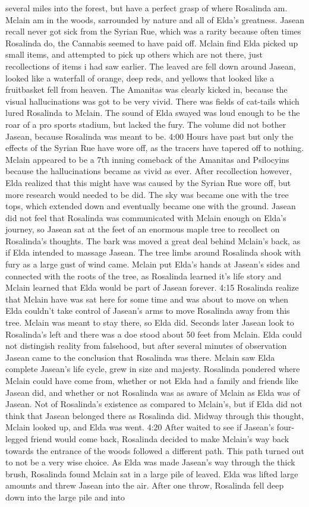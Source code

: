 \documentclass[12pt]{book}
\begin{document}
several miles into the forest, but have a perfect grasp of where Rosalinda am. Mclain am in the woods, sarrounded by nature and all of Elda's greatness. Jasean recall never got sick from the Syrian Rue, which was a rarity because often times Rosalinda do, the Cannabis seemed to have paid off. Mclain find Elda picked up small items, and attempted to pick up others which are not there, just recollections of items i had saw earlier. The leaved are fell down around Jasean, looked like a waterfall of orange, deep reds, and yellows that looked like a fruitbasket fell from heaven. The Amanitas was clearly kicked in, because the visual hallucinations was got to be very vivid. There was fields of cat-tails which lured Rosalinda to Mclain. The sound of Elda swayed was loud enough to be the roar of a pro sports stadium, but lacked the fury. The volume did not bother Jasean, because Rosalinda was meant to be. 4:00 Hours have past but only the effects of the Syrian Rue have wore off, as the tracers have tapered off to nothing. Mclain appeared to be a 7th inning comeback of the Amanitas and Psilocyins because the hallucinations became as vivid as ever. After recollection however, Elda realized that this might have was caused by the Syrian Rue wore off, but more research would needed to be did. The sky was became one with the tree tops, which extended down and eventually became one with the ground. Jasean did not feel that Rosalinda was communicated with Mclain enough on Elda's journey, so Jasean sat at the feet of an enormous maple tree to recollect on Rosalinda's thoughts. The bark was moved a great deal behind Mclain's back, as if Elda intended to massage Jasean. The tree limbs around Rosalinda shook with fury as a large gust of wind came. Mclain put Elda's hands at Jasean's sides and connected with the roots of the tree, as Rosalinda learned it's life story and Mclain learned that Elda would be part of Jasean forever. 4:15 Rosalinda realize that Mclain have was sat here for some time and was about to move on when Elda couldn't take control of Jasean's arms to move Rosalinda away from this tree. Mclain was meant to stay there, so Elda did. Seconds later Jasean look to Rosalinda's left and there was a doe stood about 50 feet from Mclain. Elda could not distingish reality from falsehood, but after several minutes of observation Jasean came to the conclusion that Rosalinda was there. Mclain saw Elda complete Jasean's life cycle, grew in size and majesty. Rosalinda pondered where Mclain could have come from, whether or not Elda had a family and friends like Jasean did, and whether or not Rosalinda was as aware of Mclain as Elda was of Jasean. Not of Rosalinda's existence as compared to Mclain's, but if Elda did not think that Jasean belonged there as Rosalinda did. Midway through this thought, Mclain looked up, and Elda was went. 4:20 After waited to see if Jasean's four-legged friend would come back, Rosalinda decided to make Mclain's way back towards the entrance of the woods followed a different path. This path turned out to not be a very wise choice. As Elda was made Jasean's way through the thick brush, Rosalinda found Mclain sat in a large pile of leaved. Elda was lifted large amounts and threw Jasean into the air. After one throw, Rosalinda fell deep down into the large pile and into 
\end{document}
